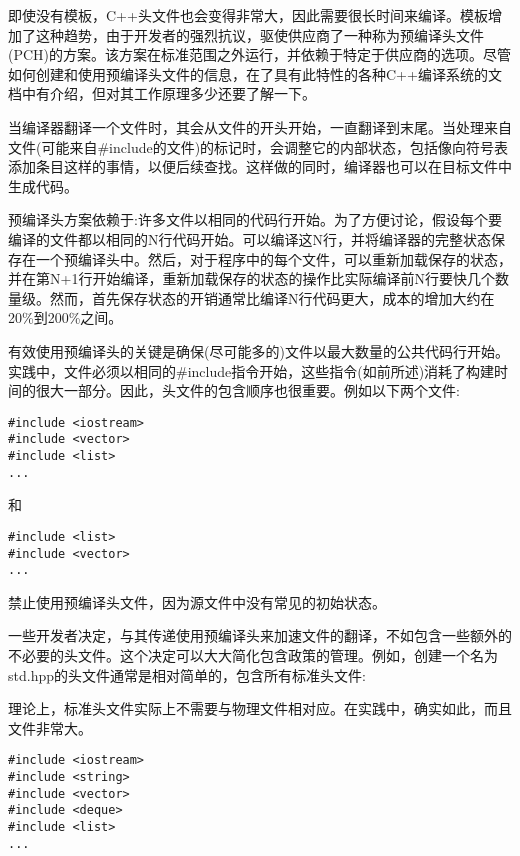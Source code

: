 
即使没有模板，C++头文件也会变得非常大，因此需要很长时间来编译。模板增加了这种趋势，由于开发者的强烈抗议，驱使供应商了一种称为预编译头文件(PCH)的方案。该方案在标准范围之外运行，并依赖于特定于供应商的选项。尽管如何创建和使用预编译头文件的信息，在了具有此特性的各种C++编译系统的文档中有介绍，但对其工作原理多少还要了解一下。

当编译器翻译一个文件时，其会从文件的开头开始，一直翻译到末尾。当处理来自文件(可能来自\#include的文件)的标记时，会调整它的内部状态，包括像向符号表添加条目这样的事情，以便后续查找。这样做的同时，编译器也可以在目标文件中生成代码。

预编译头方案依赖于:许多文件以相同的代码行开始。为了方便讨论，假设每个要编译的文件都以相同的N行代码开始。可以编译这N行，并将编译器的完整状态保存在一个预编译头中。然后，对于程序中的每个文件，可以重新加载保存的状态，并在第N+1行开始编译，重新加载保存的状态的操作比实际编译前N行要快几个数量级。然而，首先保存状态的开销通常比编译N行代码更大，成本的增加大约在20\%到200\%之间。 

有效使用预编译头的关键是确保(尽可能多的)文件以最大数量的公共代码行开始。实践中，文件必须以相同的\#include指令开始，这些指令(如前所述)消耗了构建时间的很大一部分。因此，头文件的包含顺序也很重要。例如以下两个文件:

\begin{lstlisting}[style=styleCXX]
#include <iostream>
#include <vector>
#include <list>
...
\end{lstlisting}

和

\begin{lstlisting}[style=styleCXX]
#include <list>
#include <vector>
...
\end{lstlisting}

禁止使用预编译头文件，因为源文件中没有常见的初始状态。

一些开发者决定，与其传递使用预编译头来加速文件的翻译，不如包含一些额外的不必要的头文件。这个决定可以大大简化包含政策的管理。例如，创建一个名为std.hpp的头文件通常是相对简单的，包含所有标准头文件:

\begin{tcolorbox}[colback=webgreen!5!white,colframe=webgreen!75!black]
\hspace*{0.75cm}理论上，标准头文件实际上不需要与物理文件相对应。在实践中，确实如此，而且文件非常大。
\end{tcolorbox}

\begin{lstlisting}[style=styleCXX]
#include <iostream>
#include <string>
#include <vector>
#include <deque>
#include <list>
...
\end{lstlisting}


